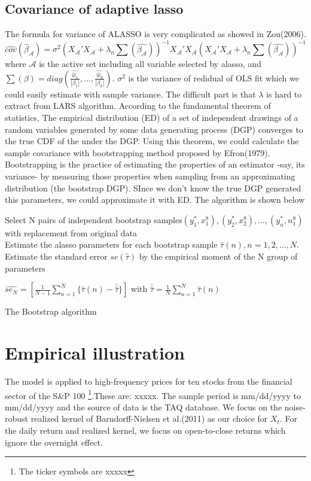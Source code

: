 \documentclass[titlepage,11pt]{article}
\begin{document}
\subsection{Covariance of adaptive lasso}
The formula for variance of ALASSO is very complicated as showed in Zou(2006). 
\begin{equation*}
\hat{cov}(\hat{\beta}_{\mathcal{A}}) = \sigma^2 (X_{\mathcal{A}}'X_{\mathcal{A}} + \lambda_n\sum(\hat{\beta_\mathcal{A}}))^{-1} X_{\mathcal{A}}'X_{\mathcal{A}} (X_{\mathcal{A}}'X_{\mathcal{A}} + \lambda_n\sum(\hat{\beta_\mathcal{A}}))^{-1}
\end{equation*}
where 
 $\mathcal{A}$ is the active set including all variable selected by alasso,
 and 
$\sum(\beta) = diag(\frac{\hat{\hat{w}_1}}{|\beta_1|},...,\frac{\hat{\hat{w}_k}}{|\beta_k|})$.
$\sigma^2$ is the variance of redidual of OLS fit which we could easily estimate with sample variance. The difficult part is that $\lambda$ is hard to extract from LARS algorithm.
According to the fundamental theorem of statistics, The empirical distribution (ED) of a set of independent drawings of a random variables generated by some data generating process (DGP) converges to the true CDF of the  under the DGP. 
Using this theorem, we could calculate the sample covariance with bootstrapping method proposed by Efron(1979). Bootstrapping is the practice of estimating the properties of an estimator -say, its variance- by measuring those properties when sampling from an approximating distribution (the bootstrap DGP).  SInce we don’t know the true DGP generated this parameters, we could approximate it with ED. The algorithm is shown below 
\begin{algorithm}[!htbp]
	Select N pairs of independent bootstrap samples$(y_1^*, x_1^8),(y_2^*, x_2^8),...,(y_n^*, n_1^8)$ with replacement from original data\\
	Estimate the alasso parameters for each bootstrap sample $\hat{\tau}(n), n=1,2,...,N.$ \\
	Estimate the standard error $se(\hat{\tau})$ by the empirical moment of the N group of parameters
		
	\(\hat{se_N} = \left[\frac{1}{N-1}\sum_{n=1}^{N}\{\hat{\tau}(n)-\bar{\hat{\tau}}\}\right] \) 
		with
	\(	\bar{\hat{\tau}} = \frac{1}{N} \sum_{n=1}^{N}\hat{\tau}(n)\)  
	\caption{The Bootstrap algorithm}
	\label{boot_alg}
\end{algorithm}
\section{Empirical illustration}
The model is applied to high-frequency prices for ten stocks from the financial sector of the S\&P 100 \footnote{The ticker symbols are xxxxx}.These are: xxxxx. The sample period is mm/dd/yyyy to mm/dd/yyyy and the source of data is the TAQ database. We focus on the noise-robust realized kernel of Barndorff-Nielsen et al.(2011) as our choice for $X_t$. For the daily return and realized kernel, we focus on open-to-close returns which ignore the overnight effect.
\end{document}
